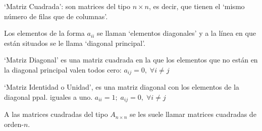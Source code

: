 \begin{defi} `Matriz Cuadrada': son matrices del tipo $n\times n$, es decir, que tienen el `mismo número de filas que de columnas'.

Los elementos de la forma $a_{ii}$ se llaman `elementos diagonales' y a la línea en que están situados se le llama `diagonal principal'.
\end{defi}
\begin{defi}
`Matriz Diagonal' es una matriz cuadrada en la que los elementos que no están en la diagonal principal valen todos cero: $a_{ij}=0, \; \forall i \neq j$	
\end{defi}
\begin{defi} `Matriz Identidad o Unidad', es una matriz diagonal con los elementos de la diagonal ppal. iguales a uno. $a_{ii}=1; \; a_{ij}=0, \; \forall i \neq j$	
\end{defi}
 A las matrices cuadradas del tipo $A_{n \times n}$ se les suele llamar matrices cuadradas de orden-$n$.


